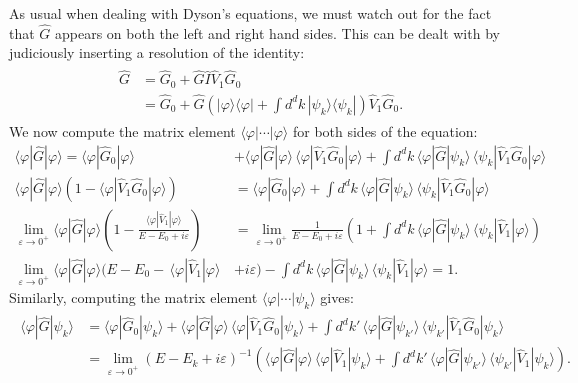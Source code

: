 \documentclass[pra,12pt]{revtex4}
\begin{document}
As usual when dealing with Dyson's equations, we must watch out for
the fact that $\hat{G}$ appears on both the left and right hand sides.
This can be dealt with by judiciously inserting a resolution of the
identity:
\begin{align}
  \begin{aligned}\hat{G} &= \hat{G}_0 + \hat{G} \hat{I} \hat{V}_1 \hat{G}_0 \\ &= \hat{G}_0 + \hat{G} \left(|\varphi\rangle\langle\varphi| + \int d^dk\, |\psi_k\rangle\langle\psi_k|\right) \hat{V}_1 \hat{G}_0. \end{aligned}
\end{align}
We now compute the matrix element
$\langle\varphi|\cdots|\varphi\rangle$ for both sides of the equation:
\begin{align}
    \langle\varphi|\hat{G}|\varphi\rangle = \langle\varphi|\hat{G}_0|\varphi\rangle &+ \langle\varphi|\hat{G}|\varphi\rangle \, \langle\varphi|\hat{V}_1 \hat{G}_0|\varphi\rangle + \int d^dk\, \langle\varphi|\hat{G}|\psi_k\rangle \, \langle\psi_k| \hat{V}_1 \hat{G}_0|\varphi\rangle \nonumber\\
    \langle\varphi|\hat{G}|\varphi\rangle \left(1 - \langle\varphi|\hat{V}_1 \hat{G}_0|\varphi\rangle\right) &= \langle\varphi|\hat{G}_0|\varphi\rangle + \int d^dk\, \langle\varphi|\hat{G}|\psi_k\rangle \, \langle\psi_k| \hat{V}_1 \hat{G}_0|\varphi\rangle \nonumber\\
    \lim_{\varepsilon\rightarrow0^+}
    \langle\varphi|\hat{G}|\varphi\rangle \left(1 - \frac{\langle\varphi|\hat{V}_1|\varphi\rangle}{E - E_0 + i\varepsilon}\right) &= \lim_{\varepsilon\rightarrow0^+} \frac{1}{E  - E_0 + i\varepsilon} \left(1+ \int d^dk\, \langle\varphi|\hat{G}|\psi_k\rangle \, \langle\psi_k| \hat{V}_1|\varphi\rangle \right) \nonumber\\
    \lim_{\varepsilon\rightarrow0^+} \langle\varphi|\hat{G}|\varphi\rangle \Big(E - E_0 -\, \langle\varphi|\hat{V}_1|\varphi\rangle \, & + i\varepsilon\Big) - \int d^dk\, \langle\varphi|\hat{G}|\psi_k\rangle \, \langle\psi_k| \hat{V}_1|\varphi\rangle = 1. \label{psiGphi}
\end{align}
Similarly, computing the matrix element
$\langle\varphi|\cdots|\psi_k\rangle$ gives:
\begin{align*}
  \begin{aligned}
\langle\varphi|\hat{G}|\psi_k\rangle &= \langle\varphi|\hat{G}_0|\psi_k\rangle + \langle\varphi|\hat{G}|\varphi\rangle \, \langle\varphi|\hat{V}_1 \hat{G}_0|\psi_k\rangle + \int d^dk'\, \langle\varphi|\hat{G}|\psi_{k'}\rangle \, \langle\psi_{k'}| \hat{V}_1 \hat{G}_0|\psi_k\rangle \\
&= \lim_{\varepsilon\rightarrow0^+} \left(E-E_k+i\varepsilon\right)^{-1} \left(\langle\varphi|\hat{G}|\varphi\rangle \, \langle\varphi|\hat{V}_1|\psi_k\rangle + \int d^dk'\, \langle\varphi|\hat{G}|\psi_{k'}\rangle \, \langle\psi_{k'}| \hat{V}_1|\psi_k\rangle\right).\end{aligned}
\end{align*}
\end{document}
